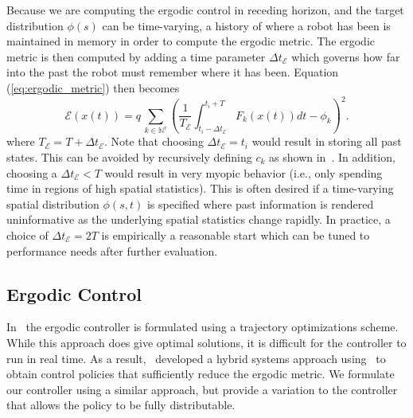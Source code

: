 \documentclass[letterpaper, 10 pt, conference]{ieeeconf}  %
\begin{document}
Because we are computing the ergodic control in receding horizon, and the target distribution $\phi(s)$ can be time-varying, a history of where a robot has been is maintained in memory in order to compute the ergodic metric.
The ergodic metric is then computed by adding a time parameter $\Delta t_\mathcal{E}$ which governs how far into the past the robot must remember where it has been. 
Equation (\ref{eq:ergodic_metric}) then becomes
\begin{equation}\label{eq:aug_ergodic_metric}
\mathcal{E}(x(t)) = q \, \sum_{k \in \mathbb{N}^v} \left( \frac{1}{T_\mathcal{E}} \int_{t_i-\Delta t_\mathcal{E} }^{t_i + T} F_k(x(t)) dt - \phi_k\right) ^2.
\end{equation}	
where $T_\mathcal{E} = T + \Delta t_\mathcal{E}$.
Note that choosing $\Delta t_\mathcal{E} = t_i$ would result in storing all past states.
This can be avoided by recursively defining $c_k$ as shown in~\cite{mavrommatiTRO2017realTime}.
In addition, choosing a $\Delta t_\mathcal{E} < T$ would result in very myopic behavior (i.e., only spending time in regions of high spatial statistics).
This is often desired if a time-varying spatial distribution $\phi(s,t)$ is specified where past information is rendered uninformative as the underlying spatial statistics change rapidly.
In practice, a choice of $\Delta t_\mathcal{E} = 2T$ is empirically a reasonable start which can be tuned to performance needs after further evaluation.

\subsection{Ergodic Control}
\label{subsec:ergodic-control}
In~\cite{miller2013trajectory} the ergodic controller is formulated using a trajectory optimizations scheme.
While this approach does give optimal solutions, it is difficult for the controller to run in real time. 
As a result,~\cite{mavrommatiTRO2017realTime} developed a hybrid systems approach using~\cite{ansari2016sequential} to obtain control policies that sufficiently reduce the ergodic metric.
We formulate our controller using a similar approach, but provide a variation to the controller that allows the policy to be fully distributable. 
	
\end{document}
